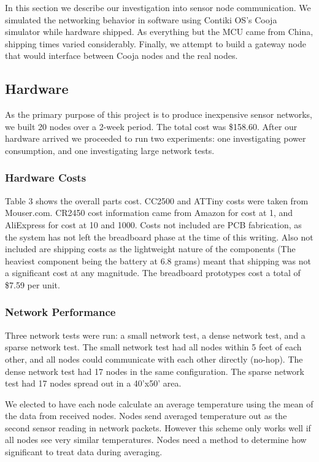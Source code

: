 In this section we describe our investigation into sensor node communication. We simulated the networking behavior in software using Contiki OS's Cooja simulator while hardware shipped. As everything but the MCU came from China, shipping times varied considerably. Finally, we attempt to build a gateway node that would interface between Cooja nodes and the real nodes.


\subsection{Hardware}

As the primary purpose of this project is to produce inexpensive sensor networks, we built 20 nodes over a 2-week period. The total cost was \$158.60. After our hardware arrived we proceeded to run two experiments: one investigating power consumption, and one investigating large network tests.

\subsubsection{Hardware Costs}

Table 3 shows the overall parts cost. CC2500 and ATTiny costs were taken from Mouser.com. CR2450 cost information came from Amazon for cost at 1, and AliExpress for cost at 10 and 1000. Costs not included are PCB fabrication, as the system has not left the breadboard phase at the time of this writing. Also not included are shipping costs as the lightweight nature of the components (The heaviest component being the battery at 6.8 grams) meant that shipping was not a significant cost at any magnitude. The breadboard prototypes cost a total of \$7.59 per unit.

\subsubsection{Network Performance} 
Three network tests were run: a small network test, a dense network test, and a sparse network test. The small network test had all nodes within 5 feet of each other, and all nodes could communicate with each other directly (no-hop). The dense network test had 17 nodes in the same configuration. The sparse network test had 17 nodes spread out in a 40'x50' area.

We elected to have each node calculate an average temperature using the mean of the data from received nodes. Nodes send averaged temperature out as the second sensor reading in network packets. However this scheme only works well if all nodes see very similar temperatures. Nodes need a method to determine how significant to treat data during averaging.

